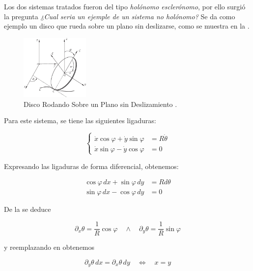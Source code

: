 \documentclass{article}
\theoremstyle{definition}
\begin{document}
Los dos sistemas tratados fueron del tipo \emph{holónomo esclerónomo}, por ello surgió la pregunta \emph{¿Cual seria un ejemple de un sistema no holónomo?} Se da como ejemplo un disco que rueda sobre un plano sin deslizarse, como se muestra en la .

\begin{figure}[htbp!]
	\centering
	\includegraphics[width=0.3\textwidth]{./Images/disk-rolling.png}
	\caption{Disco Rodando Sobre un Plano sin Deslizamiento \cite{article}.}
	\label{fig:disk_rolling}
\end{figure}

Para este sistema, se tiene las siguientes ligaduras:

\begin{equation}
	\begin{cases}
		\dot{x}\cos{\varphi} + \dot{y}\sin{\varphi} &= R\dot{\theta} \\
		\dot{x}\sin{\varphi} - \dot{y}\cos{\varphi} &= 0
	\end{cases}
\end{equation}

Expresando las ligaduras de forma diferencial, obtenemos:

\begin{align}
	\cos{\varphi} \, dx + \sin{\varphi} \, dy &= R d\theta \label{eq:dexact_theta}\\
	\sin{\varphi} \, dx - \cos{\varphi} \, dy &= 0 \label{eq:constrained_2}
\end{align}

De la  se deduce

\begin{equation}
	\partial_x \theta = \frac{1}{R} \cos{\varphi} \quad \land \quad \partial_y \theta = \frac{1}{R} \sin{\varphi}
\end{equation}

y reemplazando en  obtenemos

\begin{equation}
	\partial_y \theta \, dx = \partial_x \theta \, dy \quad \iff \quad x = y
\end{equation}
\end{document}
